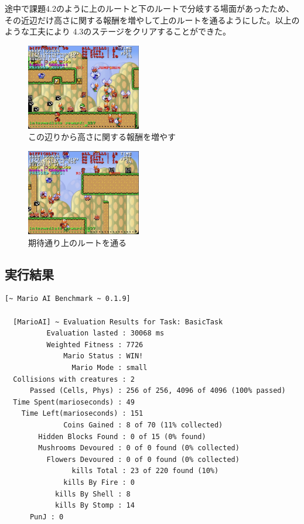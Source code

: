 \documentclass[a4paper,11pt]{jsarticle}
\begin{document}
{途中で課題4.2のように上のルートと下のルートで分岐する場面があったため、
その近辺だけ高さに関する報酬を増やして上のルートを通るようにした。以上のような工夫により
4.3のステージをクリアすることができた。

\begin{figure}[h]
  \begin{center}
    \includegraphics*[width=50mm]{images/report4/go-up-agent-from3.png}
    \caption{この辺りから高さに関する報酬を増やす}
  \end{center}
\end{figure}

\begin{figure}
  \begin{center}
    \includegraphics*[width=50mm]{images/report4/go-upper-route3.png}
    \caption{期待通り上のルートを通る}
  \end{center}
\end{figure}

\subsection*{実行結果}

\begin{lstlisting}[caption=実行結果]
  [~ Mario AI Benchmark ~ 0.1.9]

  [MarioAI] ~ Evaluation Results for Task: BasicTask
          Evaluation lasted : 30068 ms
          Weighted Fitness : 7726
              Mario Status : WIN!
                Mario Mode : small
  Collisions with creatures : 2
      Passed (Cells, Phys) : 256 of 256, 4096 of 4096 (100% passed)
  Time Spent(marioseconds) : 49
    Time Left(marioseconds) : 151
              Coins Gained : 8 of 70 (11% collected)
        Hidden Blocks Found : 0 of 15 (0% found)
        Mushrooms Devoured : 0 of 0 found (0% collected)
          Flowers Devoured : 0 of 0 found (0% collected)
                kills Total : 23 of 220 found (10%)
              kills By Fire : 0
            kills By Shell : 8
            kills By Stomp : 14
      PunJ : 0


\end{lstlisting}}
\end{document}
